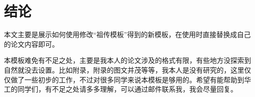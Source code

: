 \chapter{结\texorpdfstring{\quad}{}论}
本文主要是展示如何使用修改“祖传模板”得到的新模板，在使用时直接替换成自己的论文内容即可。

本模板难免有不足之处，主要是我本人的论文涉及的格式有限，有些地方没探索到自然就没去设置。比如附录，附录的图文并茂等等，我本人是没有研究的，这里仅仅做了一些初步的工作，不过对很多同学来说本模板是够用的。希望有能帮助到华工的同学们，有不足之处请多多理解，可以通过邮件联系我，我会尽量回复。
